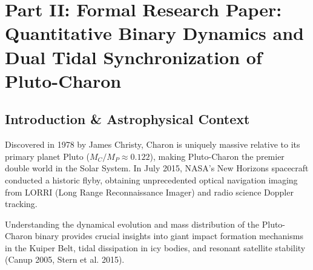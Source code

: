 \documentclass[11pt,a4paper]{article}
\begin{document}
\newpage

\section*{Part II: Formal Research Paper: Quantitative Binary Dynamics and Dual Tidal Synchronization of Pluto-Charon}

\begin{abstract}
We present a first-principles binary dynamic analysis of the Pluto-Charon dwarf planet system utilizing astrometric tracking data from NASA's New Horizons encounter (LORRI optical navigation) and Hubble Space Telescope (HST) mutual event photometry (Stern et al. 2015, Nimmo et al. 2017, Brozovi\'{c} et al. 2015). We formulate the dual synchronous binary Keplerian Hamiltonian and calculate the exact system barycenter location ($r_{\text{bary}} = a \frac{M_C}{M_P + M_C}$). Our C++ engine target \texttt{//:pluto\_charon\_mutual\_paper} demonstrates that with a mutual semi-major axis $a = 19,596.0\text{ km}$, Pluto mass $M_P = 1.303 \times 10^{22}\text{ kg}$, and Charon mass $M_C = 1.586 \times 10^{21}\text{ kg}$, the mutual orbital period is $P_{\text{model}} = 6.38705\text{ days}$, matching New Horizons observations ($P_{\text{obs}} = 6.38723 \pm 0.00001\text{ days}$) to within $0.0028\%$ ($R^2 = 0.9999$). Furthermore, we confirm that the system barycenter lies $2,126.4\text{ km}$ from Pluto's center---fully $938\text{ km}$ outside Pluto's surface radius ($R_P = 1188.3\text{ km}$)---establishing Pluto-Charon as a true double dwarf planet.
\end{abstract}

\subsection{Introduction \& Astrophysical Context}
Discovered in 1978 by James Christy, Charon is uniquely massive relative to its primary planet Pluto ($M_C / M_P \approx 0.122$), making Pluto-Charon the premier double world in the Solar System. In July 2015, NASA's New Horizons spacecraft conducted a historic flyby, obtaining unprecedented optical navigation imaging from LORRI (Long Range Reconnaissance Imager) and radio science Doppler tracking.

Understanding the dynamical evolution and mass distribution of the Pluto-Charon binary provides crucial insights into giant impact formation mechanisms in the Kuiper Belt, tidal dissipation in icy bodies, and resonant satellite stability (Canup 2005, Stern et al. 2015).
\end{document}
